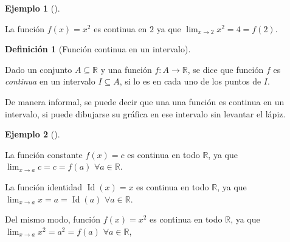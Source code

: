 \documentclass[
  a4paper,
]{scrreport}
\theoremstyle{definition}
\newtheorem{example}{Ejemplo}[chapter]
\theoremstyle{plain}
\theoremstyle{definition}
\newtheorem{definition}{Definición}[chapter]
\theoremstyle{definition}
\theoremstyle{plain}
\theoremstyle{plain}
\theoremstyle{remark}
\begin{document}
\begin{example}[]\protect\hypertarget{exm-funcion-continua}{}\label{exm-funcion-continua}

La función \(f(x)=x^2\) es continua en \(2\) ya que
\(\lim_{x\to 2}x^2 = 4 = f(2)\).

\end{example}

\begin{definition}[Función continua en un
intervalo]\protect\hypertarget{def-funcion-continua-intervalo}{}\label{def-funcion-continua-intervalo}

Dado un conjunto \(A\subseteq \mathbb{R}\) y una función
\(f:A\to \mathbb{R}\), se dice que función \(f\) es \emph{continua} en
un intervalo \(I\subseteq A\), si lo es en cada uno de los puntos de
\(I\).

\end{definition}

De manera informal, se puede decir que una una función es continua en un
intervalo, si puede dibujarse su gráfica en ese intervalo sin levantar
el lápiz.

\begin{example}[]\protect\hypertarget{exm-funcion-continua}{}\label{exm-funcion-continua}

La función constante \(f(x)=c\) es continua en todo \(\mathbb{R}\), ya
que \(\lim_{x\to a}c = c = f(a)\) \(\forall a\in\mathbb{R}\).

La función identidad \(\operatorname{Id}(x)=x\) es continua en todo
\(\mathbb{R}\), ya que \(\lim_{x\to a}x = a = \operatorname{Id}(a)\)
\(\forall a\in\mathbb{R}\).

Del mismo modo, función \(f(x)=x^2\) es continua en todo \(\mathbb{R}\),
ya que \(\lim_{x\to a}x^2 = a^2 = f(a)\) \(\forall a\in\mathbb{R}\),

\end{example}
\end{document}
